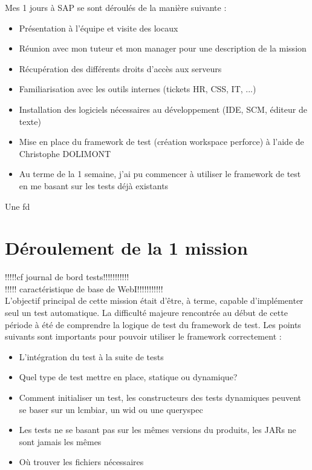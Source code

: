 Mes 1 jours \`{a} SAP se sont d\'{e}roul\'{e}s de la mani\`{e}re suivante :\\
\begin{itemize}
\item Pr\'{e}sentation \`{a} l'\'{e}quipe et visite des locaux
\item R\'{e}union avec mon tuteur et mon manager pour une description de la mission
\item R\'{e}cup\'{e}ration des diff\'{e}rents droits d'acc\`{e}s aux serveurs
\item Familiarisation avec les outils internes (tickets HR, CSS, IT, ...)
\item Installation des logiciels n\'{e}cessaires au d\'{e}veloppement (IDE, SCM, \'{e}diteur de texte)
\item Mise en place du framework de test (cr\'{e}ation workspace perforce) \`{a} l'aide de Christophe DOLIMONT
\item Au terme de la 1 semaine, j'ai pu commencer \`{a} utiliser le framework de test en me basant sur les tests d\'{e}j\`{a} existants
\end{itemize}

Une fd





\section{D\'{e}roulement de la 1 mission}

!!!!!cf journal de bord tests!!!!!!!!!!!\\
!!!!! caract\'{e}ristique de base de WebI!!!!!!!!!!!\\
L'objectif principal de cette mission \'{e}tait d'\^{e}tre, \`{a} terme, capable d'impl\'{e}menter seul un test automatique. La difficult\'{e} majeure rencontr\'{e}e au d\'{e}but de cette p\'{e}riode \`{a} \'{e}t\'{e} de comprendre la logique de test du framework de test. Les points suivants sont importants pour pouvoir utiliser le framework correctement : 
\begin{itemize}
	\item L'int\'{e}gration du test \`{a} la suite de tests 
  \item Quel type de test mettre en place, statique ou dynamique?
	\item Comment initialiser un test, les constructeurs des tests dynamiques peuvent se baser sur un lcmbiar, un wid ou une queryspec
	\item Les tests ne se basant pas sur les m\^{e}mes versions du produits, les JARs ne sont jamais les m\^{e}mes
	\item Où trouver les fichiers n\'{e}cessaires
\end{itemize}




